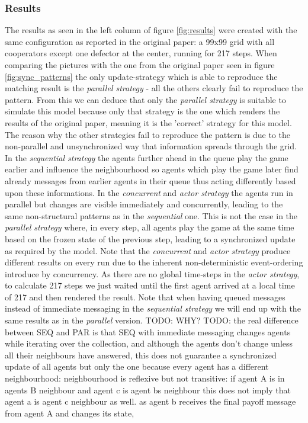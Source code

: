 \subsubsection{Results}
The results as seen in the left column of figure \ref{fig:results} were created with the same configuration as reported in the original paper: a 99x99 grid with all cooperators except one defector at the center, running for 217 steps. When comparing the pictures with the one from the original paper seen in figure \ref{fig:sync_patterns} the only update-strategy which is able to reproduce the matching result is the \textit{parallel strategy} - all the others clearly fail to reproduce the pattern. From this we can deduce that only the \textit{parallel strategy} is suitable to simulate this model because only that strategy is the one which renders the results of the original paper, meaning it is the 'correct' strategy for this model. The reason why the other strategies fail to reproduce the pattern is due to the non-parallel and unsynchronized way that information spreads through the grid. In the \textit{sequential strategy} the agents further ahead in the queue play the game earlier and influence the neighbourhood so agents which play the game later find already messages from earlier agents in their queue thus acting differently based upon these informations. In the \textit{concurrent} and \textit{actor strategy} the agents run in parallel but changes are visible immediately and concurrently, leading to the same non-structural patterns as in the \textit{sequential} one. This is not the case in the \textit{parallel strategy}  where, in every step, all agents play the game at the same time based on the frozen state of the previous step, leading to a synchronized update as required by the model. Note that the \textit{concurrent} and \textit{actor strategy} produce different results on every run due to the inherent non-deterministic event-ordering introduce by concurrency. As there are no global time-steps in the \textit{actor strategy}, to calculate 217 steps we just waited until the first agent arrived at a local time of 217 and then rendered the result.
Note that when having queued messages instead of immediate messaging in the \textit{sequential strategy} we will end up with the same results as in the \textit{parallel} version. TODO: WHY? TODO: the real difference between SEQ and PAR is that SEQ with immediate messaging changes agents while iterating over the collection, and although the agents don't change unless all their neighbours have answered, this does not guarantee a synchronized update of all agents but only the one because every agent has a different neighbourhood: neighbourhood is reflexive but not transitive: if agent A is in agents B neighbour and agent c is agent bs neighbour this does not imply that agent a is agent c neighbour as well. as agent b receives the final payoff message from agent A and changes its state, 

